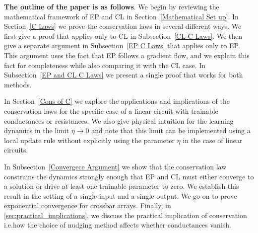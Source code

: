 \documentclass[final, 11pt, nonatbib]{elsarticle}
\theoremstyle{definition}
\theoremstyle{plain}
\newcommand{\AGK}{\color{blue}}
\numberwithin{equation}{section}
\begin{document}








\textbf{The outline of the paper is as follows}. We begin by reviewing the mathematical framework of EP  and CL in Section~\ref{Mathematical Set up}. In Section~\ref{C Laws} we prove the conservation laws in several different ways. We first give a proof that applies only to CL in Subsection~\ref{CL C Laws}. We then give a separate argument in Subsection~\ref{EP C Laws} that applies only to EP. This argument uses the fact that EP follows a gradient flow, and we explain this fact for completeness while also comparing it with the CL case. In Subsection~\ref{EP and CL C Laws} we present a single proof that works for both methods.

In Section~\ref{Cons of C} we explore the applications and implications of the conservation laws for the specific case of a linear circuit with trainable conductances or resistances. We also give physical intuition for the learning dynamics in the limit $\eta \to 0$ and note that this limit can be implemented using a local update rule without explicitly using the parameter $\eta$ in the case of linear circuits.

In Subsection~\ref{Convergece Argument} we show that the conservation law constrains the dynamics strongly enough that EP and CL must either converge to a solution or drive at least one trainable parameter to zero. We establish this result in the setting of a single input and a single output. We go on to prove exponential convergence for crossbar arrays. Finally, in \ref{sec:practical_implications}, we discuss the practical implication of conservation i.e.\@ how the choice of nudging method affects whether conductances vanish.
\end{document}

